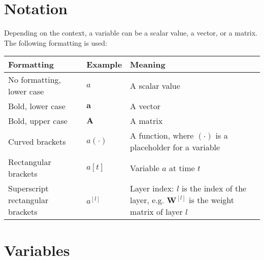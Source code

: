 \section{Notation}

Depending on the context, a variable can be a scalar value, a vector, or a matrix. The following formatting is used:

\begin{tabular}{ p{5cm} p{2cm} p{7cm} }
	\textbf{Formatting} & \textbf{Example} & \textbf{Meaning}\\
	\hline
  	No formatting, lower case & $a$ & A scalar value\\
  	Bold, lower case & $\boldsymbol{a}$ & A vector\\
  	Bold, upper case & $\boldsymbol{A}$ & A matrix\\
  	Curved brackets & $a(\cdot)$ & A function, where $(\cdot)$ is a placeholder for a variable\\
  	Rectangular brackets & $a[t]$ & Variable $a$ at time $t$\\
   Superscript rectangular brackets & $a^{[l]}$ & Layer index: $l$ is the index of the layer, e.g. $\boldsymbol{W}^{[l]}$ is the weight matrix of layer $l$\\
\end{tabular}

\section{Variables}

